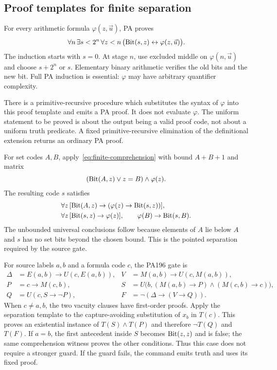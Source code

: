 \subsection{Proof templates for finite separation}
For every arithmetic formula $\varphi(z,\vec u)$, PA proves
\begin{equation}\label{eq:finite-comprehension}
 \forall n\,\exists s<2^n\,\forall z<n\,
 \bigl(\operatorname{Bit}(s,z)\leftrightarrow\varphi(z,\vec u)\bigr).
\end{equation}
The induction starts with $s=0$. At stage $n$, use excluded middle on $\varphi(n,\vec u)$ and choose $s+2^n$ or $s$. Elementary binary arithmetic verifies the old bits and the new bit. Full PA induction is essential: $\varphi$ may have arbitrary quantifier complexity.

There is a primitive-recursive procedure which substitutes the syntax of $\varphi$ into this proof template and emits a PA proof. It does not evaluate $\varphi$. The uniform statement to be proved is about the output being a valid proof code, not about a uniform truth predicate. A fixed primitive-recursive elimination of the definitional extension returns an ordinary PA proof.

For set codes $A,B$, apply~\eqref{eq:finite-comprehension} with bound $A+B+1$ and matrix
\[
 (\operatorname{Bit}(A,z)\vee z=B)\wedge\varphi(z).
\]
The resulting code $s$ satisfies
\begin{align*}
 &\forall z\,[\operatorname{Bit}(A,z)\to(\varphi(z)\to\operatorname{Bit}(s,z))],\\
 &\forall z\,[\operatorname{Bit}(s,z)\to\varphi(z)],\qquad
 \varphi(B)\to\operatorname{Bit}(s,B).
\end{align*}
The unbounded universal conclusions follow because elements of $A$ lie below $A$ and $s$ has no set bits beyond the chosen bound. This is the pointed separation required by the source gate.

For source labels $a,b$ and a formula code $c$, the PA196 gate is
\begin{align*}
 \Delta&=E(a,b)\to U(c,E(a,b)), &
 V&=M(a,b)\to U(c,M(a,b)),\\
 P&=c\to M(c,b), &
 S&=U\bigl(b,(M(a,b)\to P)\wedge(M(c,b)\to c)\bigr),\\
 Q&=U(c,S\to\neg P), &
 F&=\neg(\Delta\to(V\to Q)).
\end{align*}
When $c\ne a,b$, the two vacuity clauses have first-order proofs. Apply the separation template to the capture-avoiding substitution of $x_b$ in $T(c)$. This proves an existential instance of $T(S)\wedge T(P)$ and therefore $\neg T(Q)$ and $T(F)$. If $a=b$, the first antecedent inside $S$ becomes $\operatorname{Bit}(z,z)$ and is false; the same comprehension witness proves the other conditions. Thus this case does not require a stronger guard. If the guard fails, the command emits truth and uses its fixed proof.

